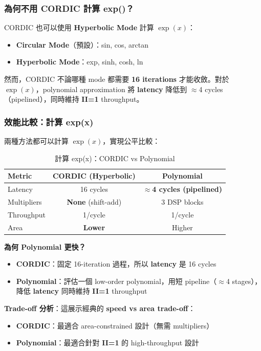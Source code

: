 \documentclass[journal]{IEEEtran}
\begin{document}
\subsubsection{為何不用 CORDIC 計算 exp()？}
CORDIC 也可以使用 \textbf{Hyperbolic Mode} 計算 $\exp(x)$：
\begin{itemize}
    \item \textbf{Circular Mode}（預設）：sin, cos, arctan
    \item \textbf{Hyperbolic Mode}：exp, sinh, cosh, ln
\end{itemize}

然而，CORDIC 不論哪種 mode 都需要 \textbf{16 iterations} 才能收斂。對於 $\exp(x)$，polynomial approximation 將 \textbf{latency} 降低到 $\approx$4 cycles（pipelined），同時維持 \textbf{II=1} throughput。

\subsubsection{效能比較：計算 exp(x)}
兩種方法都可以計算 $\exp(x)$，實現公平比較：

\begin{table}[!t]
\centering
\caption{計算 exp(x)：CORDIC vs Polynomial}
\footnotesize
\begin{tabular}{@{}lcc@{}}
\toprule
\textbf{Metric} & \textbf{CORDIC (Hyperbolic)} & \textbf{Polynomial} \\
\midrule
Latency & 16 cycles & \textbf{$\approx$4 cycles (pipelined)} \\
Multipliers & \textbf{None} (shift-add) & 3 DSP blocks \\
Throughput & 1/cycle & 1/cycle \\
Area & \textbf{Lower} & Higher \\
\bottomrule
\end{tabular}
\end{table}

\textbf{為何 Polynomial 更快？}
\begin{itemize}
    \item \textbf{CORDIC}：固定 16-iteration 過程，所以 \textbf{latency} 是 16 cycles
    \item \textbf{Polynomial}：評估一個 low-order polynomial，用短 pipeline（$\approx$4 stages），降低 \textbf{latency} 同時維持 \textbf{II=1} throughput
\end{itemize}

\textbf{Trade-off 分析}：這展示經典的 \textbf{speed vs area trade-off}：
\begin{itemize}
    \item \textbf{CORDIC}：最適合 area-constrained 設計（無需 multipliers）
    \item \textbf{Polynomial}：最適合針對 \textbf{II=1} 的 high-throughput 設計
\end{itemize}
\end{document}
